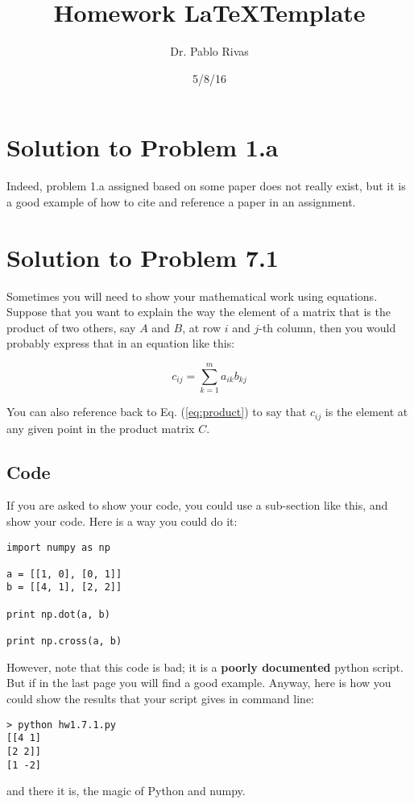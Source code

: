 \documentclass[a4paper]{article}
\title{Homework \LaTeX Template}
\author{Dr. Pablo Rivas}
\date{5/8/16}
\begin{document}
\lstset{language=Python}

\maketitle

\section{Solution to Problem 1.a}
Indeed, problem 1.a assigned based on some paper\cite{HB98} does not really
exist, but it is a good example of how to cite and reference a paper in an
assignment.

\section{Solution to Problem 7.1}
Sometimes you will need to show your mathematical work using equations. Suppose
that you want to explain the way the element of a matrix that is the product of
two others, say $A$ and $B$, at row $i$ and $j$-th column, then you would
probably express that in an equation like this:

\begin{equation}
  c_{ij} = \sum^m_{k=1} a_{ik} b_{kj}
  \label{eq:product}
\end{equation}

You can also reference back to Eq. (\ref{eq:product}) to say that $c_{ij}$ is the
element at any given point in the product matrix $C$.

\subsection{Code}
If you are asked to show your code, you could use a sub-section like this, and
show your code. Here is a way you could do it:

\begin{lstlisting}[frame=single]
import numpy as np

a = [[1, 0], [0, 1]]
b = [[4, 1], [2, 2]]

print np.dot(a, b)

print np.cross(a, b)
\end{lstlisting}

However, note that this code is bad; it is a \textbf{poorly documented} python
script. But if in the last page you will find a good example. Anyway, here is
how you could show the results that your script gives in command line:
\begin{lstlisting}
> python hw1.7.1.py 
[[4 1]
[2 2]]
[1 -2]
\end{lstlisting}
and there it is, the magic of Python and numpy.
\end{document}
